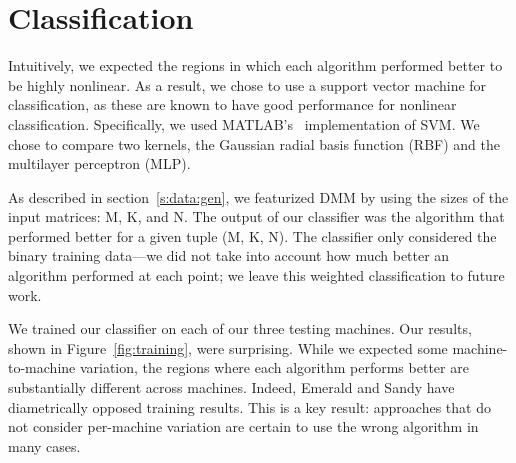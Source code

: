 \section{Classification}
\label{s:class}
Intuitively, we expected the regions in which each algorithm performed better to be highly nonlinear.
As a result, we chose to use a support vector machine for classification, as these are known to have good performance for nonlinear classification.
Specifically, we used MATLAB's~ implementation of SVM.
We chose to compare two kernels, the Gaussian radial basis function (RBF) and the multilayer perceptron (MLP).

As described in section~\ref{s:data:gen}, we featurized DMM by using the sizes of the input matrices: M, K, and N.
The output of our classifier was the algorithm that performed better for a given tuple (M, K, N).
The classifier only considered the binary training data---we did not take into account how much better an algorithm performed at each point; we leave this weighted classification to future work.

We trained our classifier on each of our three testing machines.
Our results, shown in Figure~\ref{fig:training}, were surprising.
While we expected some machine-to-machine variation, the regions where each algorithm performs better are substantially different across machines.
Indeed, Emerald and Sandy have diametrically opposed training results.
This is a key result: approaches that do not consider per-machine variation are certain to use the wrong algorithm in many cases.

